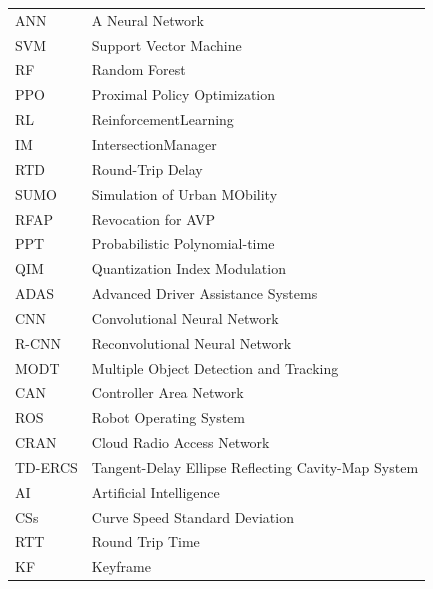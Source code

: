 \documentclass[a4paper,12pt]{article}
\begin{document}
\begin{center}
\begin{longtable}{|l|l|}
ANN & A Neural Network\\

SVM & Support Vector Machine\\

RF & Random Forest \\

PPO & Proximal Policy Optimization \\

RL & ReinforcementLearning \\

IM & IntersectionManager \\

RTD & Round-Trip Delay \\

SUMO & Simulation of Urban MObility\\

RFAP & Revocation for AVP\\

PPT & Probabilistic Polynomial-time \\

QIM & Quantization Index Modulation \\

ADAS & Advanced Driver Assistance Systems \\

CNN & Convolutional Neural Network \\

R-CNN & Reconvolutional Neural Network \\

MODT & Multiple Object Detection and Tracking \\

CAN & Controller Area Network \\

ROS & Robot Operating System \\

CRAN & Cloud Radio Access Network \\

TD-ERCS & Tangent-Delay Ellipse Reflecting Cavity-Map System \\

AI & Artificial Intelligence\\

CSs & Curve Speed Standard Deviation \\

RTT & Round Trip Time \\

KF & Keyframe \\


\end{longtable}
\end{center}
\end{document}
